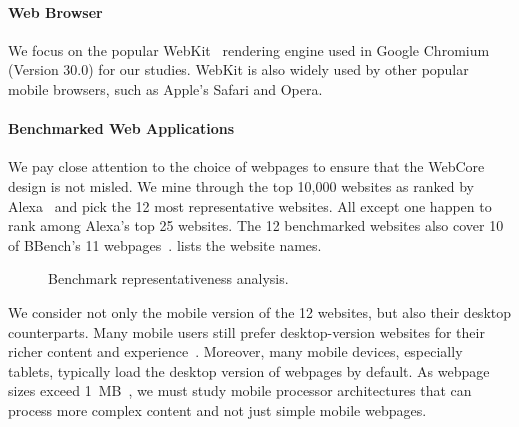 \paragraph{Web Browser} We focus on the popular WebKit~\cite{webkit} rendering engine used in Google Chromium (Version 30.0) for our studies. WebKit is also widely used by other popular mobile browsers, such as Apple's Safari and Opera.

\paragraph{Benchmarked Web Applications}  We pay close attention to the choice of webpages to ensure that the WebCore design is not misled. We mine through the top 10,000 websites as ranked by Alexa~\cite{alexa} and pick the 12 most representative websites. All except one happen to rank among Alexa's top 25 websites. The 12 benchmarked websites also cover 10 of BBench's 11 webpages~\cite{BBench}.  lists the website names.

\begin{figure}[t]
\centering
{}
\hspace*{15pt}
\caption{\small Benchmark representativeness analysis.}
\label{fig:bench}
\end{figure}

We consider not only the mobile version of the 12 websites, but also their desktop counterparts. Many mobile users still prefer desktop-version websites for their richer content and experience~\cite{Slocum:2011fk,Bixby:2011uq}. Moreover, many mobile devices, especially tablets, typically load the desktop version of webpages by default. As webpage sizes exceed 1~MB~\cite{Everts:2011kx}, we must study mobile processor architectures that can process more complex content and not just simple mobile webpages.

